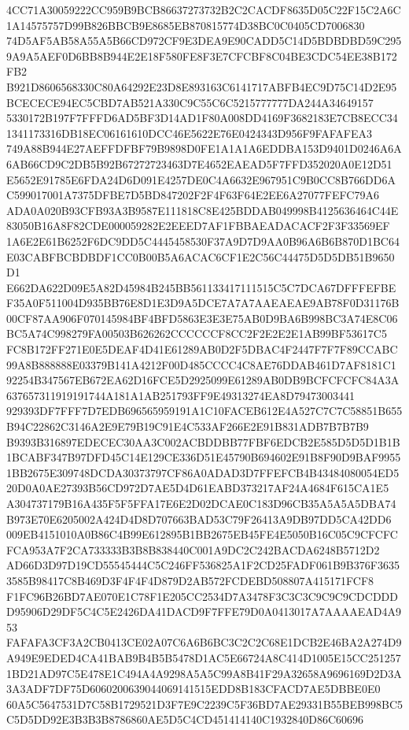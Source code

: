 \documentclass[UTF8,fontset=fandol,zihao=-4,a4paper]{ctexart}
\begin{document}
{{4CC71A30059222CC959B9BCB86637273732B2C2CACDF8635D05C22F15C2A6C1A14575757D99B826BBCB9E8685EB870815774D38BC0C0405CD7006830
74D5AF5AB58A55A5B66CD972CF9E3DEA9E90CADD5C14D5BDBDBD59C2959A9A5AEF0D6BB8B944E2E18F580FE8F3E7CFCBF8C04BE3CDC54EE38B172FB2
B921D8606568330C80A64292E23D8E893163C6141717ABFB4EC9D75C14D2E95BCECECE94EC5CBD7AB521A330C9C55C6C5215777777DA244A34649157
5330172B197F7FFFD6AD5BF3D14AD1F80A008DD4169F3682183E7CB8ECC341341173316DB18EC06161610DCC46E5622E76E0424343D956F9FAFAFEA3
749A88B944E27AEFFDFBF79B9898D0FE1A1A1A6EDDBA153D9401D0246A6A6AB66CD9C2DB5B92B67272723463D7E4652EAEAD5F7FFD352020A0E12D51
E5652E91785E6FDA24D6D091E4257DE0C4A6632E967951C9B0CC8B766DD6AC599017001A7375DFBE7D5BD847202F2F4F63F64E2EE6A27077FEFC79A6
ADA0A020B93CFB93A3B9587E111818C8E425BDDAB049998B4125636464C44E83050B16A8F82CDE000059282E2EEED7AF1FBBAEADACACF2F3F33569EF
1A6E2E61B6252F6DC9DD5C4445458530F37A9D7D9AA0B96A6B6B870D1BC64E03CABFBCBDBDF1CC0B00B5A6ACAC6CF1E2C56C44475D5D5DB51B9650D1
E662DA622D09E5A82D45984B245BB561133417111515C5C7DCA67DFFFEFBEF35A0F511004D935BB76E8D1E3D9A5DCE7A7A7AAEAEAE9AB78F0D31176B
00CF87AA906F070145984BF4BFD5863E3E3E75AB0D9BA6B998BC3A74E8C06BC5A74C998279FA00503B626262CCCCCCF8CC2F2E2E2E1AB99BF53617C5
FC8B172FF271E0E5DEAF4D41E61289AB0D2F5DBAC4F2447F7F7F89CCABC99A8B888888E03379B141A4212F00D485CCCC4C8AE76DDAB461D7AF8181C1
92254B347567EB672EA62D16FCE5D2925099E61289AB0DB9BCFCFCFC84A3A637657311919191744A181A1AB251793FF9E49313274EA8D79473003441
929393DF7FFF7D7EDB696565959191A1C10FACEB612E4A527C7C7C58851B655B94C22862C3146A2E9E79B19C91E4C533AF266E2E91B831ADB7B7B7B9
B9393B316897EDECEC30AA3C002ACBDDBB77FBF6EDCB2E585D5D5D1B1B1BCABF347B97DFD45C14E129CE336D51E45790B694602E91B8F90D9BAF9955
1BB2675E309748DCDA30373797CF86A0ADAD3D7FFEFCB4B43484080054ED520D0A0AE27393B56CD972D7AE5D4D61EABD373217AF24A4684F615CA1E5
A304737179B16A435F5F5FFA17E6E2D02DCAE0C183D96CB35A5A5A5DBA74B973E70E6205002A424D4D8D707663BAD53C79F26413A9DB97DD5CA42DD6
009EB4151010A0B86C4B99E612895B1BB2675EB45FE4E5050B16C05C9CFCFCFCA953A7F2CA733333B3B8B838440C001A9DC2C242BACDA6248B5712D2
AD66D3D97D19CD55545444C5C246FF536825A1F2CD25FADF061B9B376F36353585B98417C8B469D3F4F4F4D879D2AB572FCDEBD508807A415171FCF8
F1FC96B26BD7AE070E1C78F1E205CC2534D7A3478F3C3C3C9C9C9CDCDDDD95906D29DF5C4C5E2426DA41DACD9F7FFE79D0A0413017A7AAAAEAD4A953
FAFAFA3CF3A2CB0413CE02A07C6A6B6BC3C2C2C68E1DCB2E46BA2A274D9A949E9EDED4CA41BAB9B4B5B5478D1AC5E66724A8C414D1005E15CC251257
1BD21AD97C5E478E1C494A4A9298A5A5C99A8B41F29A32658A9696169D2D3A3A3ADF7DF75D6060200639044069141515EDD8B183CFACD7AE5DBBE0E0
60A5C5647531D7C58B1729521D3F7E9C2239C5F36BD7AE29331B55BEB998BC5C5D5DD92E3B3B3B8786860AE5D5C4CD451414140C1932840D86C60696
}}
\end{document}
